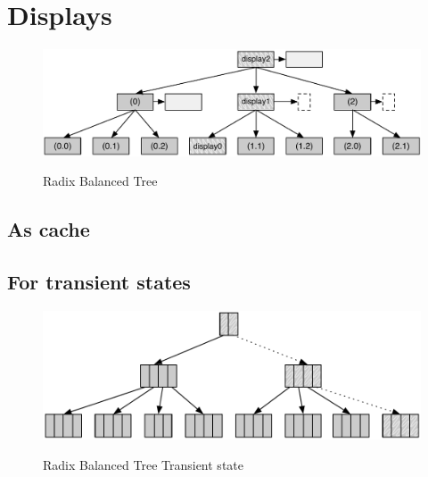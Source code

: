 
\section{Displays}

\begin{figure}[h!]
  \centering
  \includegraphics[width=\textwidth]{Figures/Balanced_subtrees}
  \label{Balanced_subtrees}
  \caption{Radix Balanced Tree}
\end{figure}



\subsection{As cache}





\subsection{For transient states}

\begin{figure}[h!]
  \centering
  \includegraphics[width=\textwidth]{Figures/Transient_state}
  \label{Transient_state}
  \caption{Radix Balanced Tree Transient state}
\end{figure}


